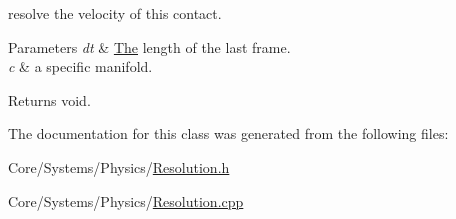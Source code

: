 resolve the velocity of this contact. 


\begin{DoxyParams}{Parameters}
{\em dt} & \hyperlink{classThe}{The} length of the last frame. \\
\hline
{\em c} & a specific manifold. \\
\hline
\end{DoxyParams}
\begin{DoxyReturn}{Returns}
void. 
\end{DoxyReturn}


The documentation for this class was generated from the following files\-:\begin{DoxyCompactItemize}
\item 
Core/\-Systems/\-Physics/\hyperlink{Resolution_8h}{Resolution.\-h}\item 
Core/\-Systems/\-Physics/\hyperlink{Resolution_8cpp}{Resolution.\-cpp}\end{DoxyCompactItemize}

